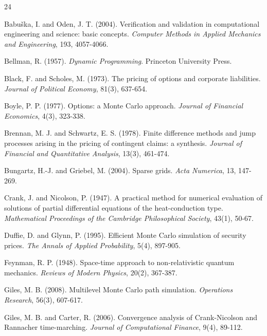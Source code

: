 \documentclass[11pt,a4paper]{article}
\begin{document}
\begin{thebibliography}{24}

Babu\v{s}ka, I. and Oden, J. T. (2004). Verification and validation in computational engineering and science: basic concepts. \emph{Computer Methods in Applied Mechanics and Engineering}, 193, 4057-4066.

Bellman, R. (1957). \emph{Dynamic Programming}. Princeton University Press.

Black, F. and Scholes, M. (1973). The pricing of options and corporate liabilities. \emph{Journal of Political Economy}, 81(3), 637-654.

Boyle, P. P. (1977). Options: a Monte Carlo approach. \emph{Journal of Financial Economics}, 4(3), 323-338.

Brennan, M. J. and Schwartz, E. S. (1978). Finite difference methods and jump processes arising in the pricing of contingent claims: a synthesis. \emph{Journal of Financial and Quantitative Analysis}, 13(3), 461-474.

Bungartz, H.-J. and Griebel, M. (2004). Sparse grids. \emph{Acta Numerica}, 13, 147-269.

Crank, J. and Nicolson, P. (1947). A practical method for numerical evaluation of solutions of partial differential equations of the heat-conduction type. \emph{Mathematical Proceedings of the Cambridge Philosophical Society}, 43(1), 50-67.

Duffie, D. and Glynn, P. (1995). Efficient Monte Carlo simulation of security prices. \emph{The Annals of Applied Probability}, 5(4), 897-905.

Feynman, R. P. (1948). Space-time approach to non-relativistic quantum mechanics. \emph{Reviews of Modern Physics}, 20(2), 367-387.

Giles, M. B. (2008). Multilevel Monte Carlo path simulation. \emph{Operations Research}, 56(3), 607-617.

Giles, M. B. and Carter, R. (2006). Convergence analysis of Crank-Nicolson and Rannacher time-marching. \emph{Journal of Computational Finance}, 9(4), 89-112.


\end{thebibliography}
\end{document}
